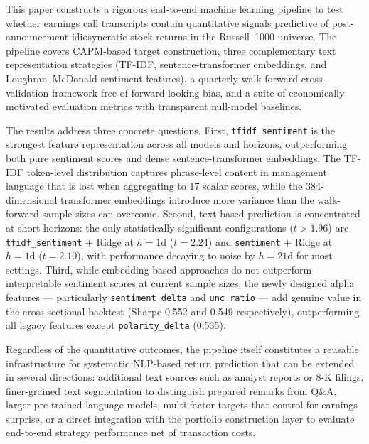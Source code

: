 \documentclass{article}
\begin{document}
This paper constructs a rigorous end-to-end machine learning pipeline to test whether earnings call transcripts contain quantitative signals predictive of post-announcement idiosyncratic stock returns in the Russell~1000 universe. The pipeline covers CAPM-based target construction, three complementary text representation strategies (TF-IDF, sentence-transformer embeddings, and Loughran--McDonald sentiment features), a quarterly walk-forward cross-validation framework free of forward-looking bias, and a suite of economically motivated evaluation metrics with transparent null-model baselines.

The results address three concrete questions. First, \texttt{tfidf\_sentiment} is the strongest feature representation across all models and horizons, outperforming both pure sentiment scores and dense sentence-transformer embeddings. The TF-IDF token-level distribution captures phrase-level content in management language that is lost when aggregating to 17 scalar scores, while the 384-dimensional transformer embeddings introduce more variance than the walk-forward sample sizes can overcome. Second, text-based prediction is concentrated at short horizons: the only statistically significant configurations ($t>1.96$) are \texttt{tfidf\_sentiment} + Ridge at $h=1\text{d}$ ($t=2.24$) and \texttt{sentiment} + Ridge at $h=1\text{d}$ ($t=2.10$), with performance decaying to noise by $h=21\text{d}$ for most settings. Third, while embedding-based approaches do not outperform interpretable sentiment scores at current sample sizes, the newly designed alpha features --- particularly \texttt{sentiment\_delta} and \texttt{unc\_ratio} --- add genuine value in the cross-sectional backtest (Sharpe 0.552 and 0.549 respectively), outperforming all legacy features except \texttt{polarity\_delta} (0.535).

Regardless of the quantitative outcomes, the pipeline itself constitutes a reusable infrastructure for systematic NLP-based return prediction that can be extended in several directions: additional text sources such as analyst reports or 8-K filings, finer-grained text segmentation to distinguish prepared remarks from Q\&A, larger pre-trained language models, multi-factor targets that control for earnings surprise, or a direct integration with the portfolio construction layer to evaluate end-to-end strategy performance net of transaction costs.
\end{document}
